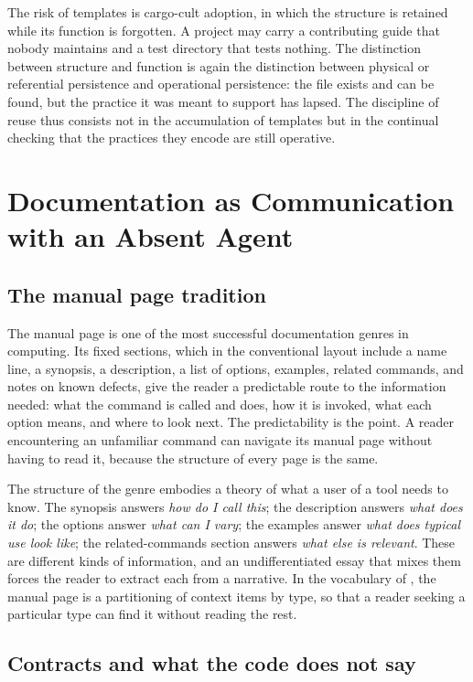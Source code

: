 \documentclass[11pt,twoside,openright]{book}
\theoremstyle{plain}
\theoremstyle{definition}
\theoremstyle{remark}
\begin{document}
The risk of templates is cargo-cult adoption, in which the structure is retained while its function is forgotten. A project may carry a contributing guide that nobody maintains and a test directory that tests nothing. The distinction between structure and function is again the distinction between physical or referential persistence and operational persistence: the file exists and can be found, but the practice it was meant to support has lapsed. The discipline of reuse thus consists not in the accumulation of templates but in the continual checking that the practices they encode are still operative.

\chapter{Documentation as Communication with an Absent Agent}\label{ch:documentation}

\section{The manual page tradition}

The manual page is one of the most successful documentation genres in computing. Its fixed sections, which in the conventional layout include a name line, a synopsis, a description, a list of options, examples, related commands, and notes on known defects, give the reader a predictable route to the information needed: what the command is called and does, how it is invoked, what each option means, and where to look next. The predictability is the point. A reader encountering an unfamiliar command can navigate its manual page without having to read it, because the structure of every page is the same.

The structure of the genre embodies a theory of what a user of a tool needs to know. The synopsis answers \emph{how do I call this}; the description answers \emph{what does it do}; the options answer \emph{what can I vary}; the examples answer \emph{what does typical use look like}; the related-commands section answers \emph{what else is relevant}. These are different kinds of information, and an undifferentiated essay that mixes them forces the reader to extract each from a narrative. In the vocabulary of , the manual page is a partitioning of context items by type, so that a reader seeking a particular type can find it without reading the rest.

\section{Contracts and what the code does not say}
\end{document}

